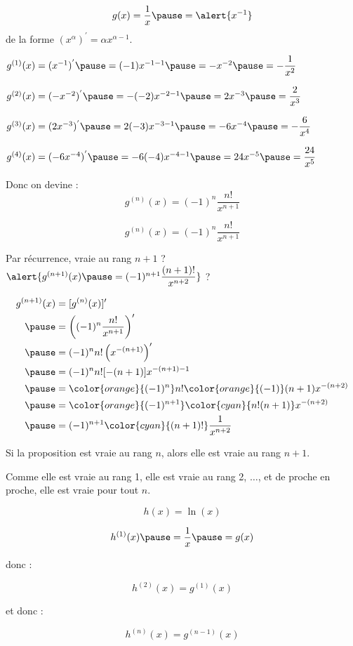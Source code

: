 \documentclass[9pt,handout,professionalfonts,hyperref]{beamer}
\begin{document}
\begin{frame}
$$
g(x)=\dfrac{1}{x}\pause = \alert{x^{-1}}
$$
 \pause
de la forme $(x^\alpha)^{'} = \alpha x^{\alpha-1}$. 
\pause
\medskip

$g^{(1)}(x)= (x^{-1})^{'} \pause = (-1)x^{-1-1} \pause = -x^{-2} \pause = -\dfrac{1}{x^2}$
 \pause
\medskip

$g^{(2)}(x)=(-x^{-2})^{'} \pause =-(-2)x^{-2-1} \pause =2x^{-3}\pause = \dfrac{2}{x^3}$
 \pause
\medskip

$g^{(3)}(x)= (2x^{-3})^{'}\pause = 2 (-3)x^{-3-1}\pause = -6x^{-4}\pause =-\dfrac{6}{x^4}$
 \pause
\medskip

$g^{(4)}(x)=(-6x^{-4})^{'} \pause = -6(-4)x^{-4-1} \pause = 24x^{-5} \pause = \dfrac{24}{x^5}$
 \pause
\medskip

Donc on devine : $$g^{(n)}(x)=(-1)^n\dfrac{n!}{x^{n+1}}$$

\end{frame}

\begin{frame}
$$g^{(n)}(x)=(-1)^n\dfrac{n!}{x^{n+1}}$$
 \pause
\medskip

Par récurrence, vraie au rang $n+1$ ? \pause $\alert{g^{(n+1)}(x) \pause =(-1)^{n+1}\dfrac{(n+1)!}{x^{n+2}}}$ ? 
\pause
\medskip

\[\begin{aligned}
g^{(n+1)}(x) 
& =[g^{(n)}(x)]' \\
\pause & = \left((-1)^n\dfrac{n!}{x^{n+1}}\right)'\\
\pause & = (-1)^n n! \left(x^{-(n+1)}\right)'\\
\pause & =(-1)^n n! [-(n+1)] x^{-(n+1)-1} \\
\pause & = {\color{orange}{(-1)^n}} n! {\color{orange}{(-1)}}(n+1) x^{-(n+2)} \\
\pause & ={\color{orange}{(-1)^{n+1}}} {\color{cyan}{n!(n+1)}} x^{-(n+2)} \\
\pause & =(-1)^{n+1} {\color{cyan}{(n+1)!}} \dfrac{1}{x^{n+2}} \\
\end{aligned}\]\newline 

Si la proposition est vraie au rang $n$, alors elle est vraie au rang $n+1$. 

Comme elle est vraie au rang 1, elle est vraie au rang 2, $\dots$, et de proche en proche, elle est vraie pour tout $n$. 

\end{frame}

\begin{frame}
$$
h(x)=\ln(x)
$$
\pause
\medskip

$$h^{(1)}(x)\pause =\dfrac{1}{x}\pause =g(x)$$

\pause donc :

$$h^{(2)}(x)=g^{(1)}(x)$$

\pause et donc : 

$$h^{(n)}(x)=g^{(n-1)}(x)$$

\end{frame}
\end{document}
